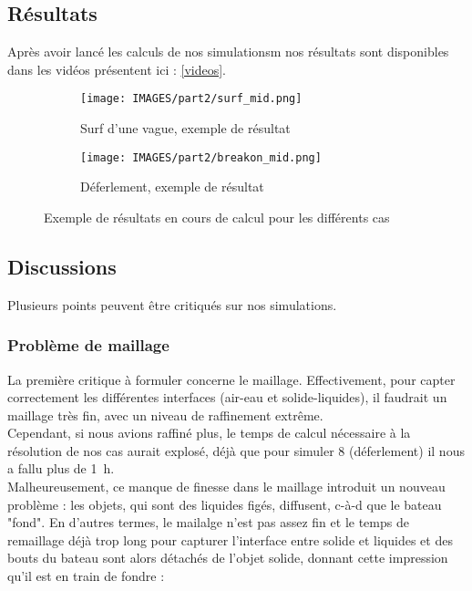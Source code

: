 \documentclass[../main.tex]{subfiles}
\begin{document}
\subsection{Résultats}
Après avoir lancé les calculs de nos simulationsm nos résultats sont disponibles dans les vidéos présentent ici : \href{https://github.com/YohStablo/CERF_ZEPHYR/tree/main/VIDEOS}{[videos]}.

\begin{figure}[H]
\centering
\begin{subfigure}[b]{16cm}
    \centering
    \texttt{[image: IMAGES/part2/surf\_mid.png]}
    \caption{Surf d'une vague, exemple de résultat}
\end{subfigure}
\vfill
\begin{subfigure}[b]{16cm}
    \centering
    \texttt{[image: IMAGES/part2/breakon\_mid.png]}
    \caption{Déferlement, exemple de résultat}
\end{subfigure}
\caption{Exemple de résultats en cours de calcul pour les différents cas}
\end{figure}

\subsection{Discussions}
Plusieurs points peuvent être critiqués sur nos simulations.

\subsubsection*{Problème de maillage}
La première critique à formuler concerne le maillage. Effectivement, pour capter correctement les différentes interfaces (air-eau et solide-liquides), il faudrait un maillage très fin, avec un niveau de raffinement extrême.\\
Cependant, si nous avions raffiné plus, le temps de calcul nécessaire à la résolution de nos cas aurait explosé, déjà que pour simuler \qty{8}{\sec} (déferlement) il nous a fallu plus de \qty{1}{\hour}.\\

Malheureusement, ce manque de finesse dans le maillage introduit un nouveau problème : les objets, qui sont des liquides figés, diffusent, c-à-d que le bateau "fond". En d'autres termes, le mailalge n'est pas assez fin et le temps de remaillage déjà trop long pour capturer l'interface entre solide et liquides et des bouts du bateau sont alors détachés de l'objet solide, donnant cette impression qu'il est en train de fondre :
\end{document}
